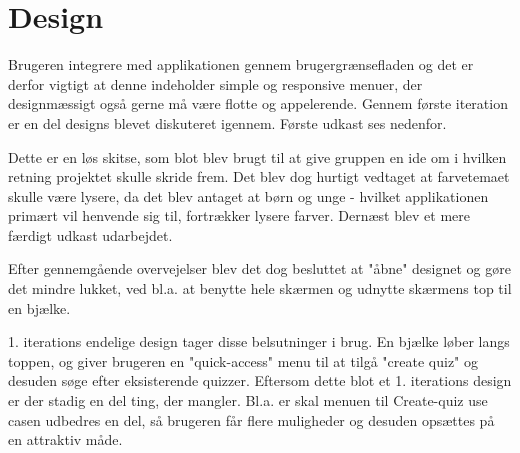 \chapter{Design}
Brugeren integrere med applikationen gennem brugergrænsefladen og det er derfor vigtigt at denne indeholder simple og responsive menuer, der designmæssigt også gerne må være flotte og appelerende.  
Gennem første iteration er en del designs blevet diskuteret igennem. Første udkast ses nedenfor. \\


Dette er en løs skitse, som blot blev brugt til at give gruppen en ide om i hvilken retning projektet skulle skride frem. Det blev dog hurtigt vedtaget at farvetemaet skulle være lysere, da det blev antaget at børn og unge - hvilket applikationen primært vil henvende sig til, fortrækker lysere farver.
Dernæst blev et mere færdigt udkast udarbejdet.\\ 



Efter gennemgående overvejelser blev det dog besluttet at "åbne" designet og gøre det mindre lukket, ved bl.a. at benytte hele skærmen og udnytte skærmens top til en bjælke. \\



1. iterations endelige design tager disse belsutninger i brug. En bjælke løber langs toppen, og giver brugeren en "quick-access" menu til at tilgå "create quiz" og desuden søge efter eksisterende quizzer. 
Eftersom dette blot et 1. iterations design er der stadig en del ting, der mangler. Bl.a. er skal menuen til Create-quiz use casen udbedres en del, så brugeren får flere muligheder og desuden opsættes på en attraktiv måde. 
